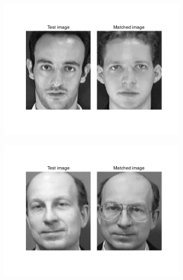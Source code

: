 \begin{homeworkProblem}
\begin{figure}[H]
\begin{subfigure}{0.5\textwidth}
      \includegraphics[width=1.\linewidth]{./images/match_3.png}
    \end{subfigure}%
    \begin{subfigure}{0.5\textwidth}
      \centering
      \includegraphics[width=1.\linewidth]{./images/match_4.png}
    \end{subfigure}
  \end{figure}
  \begin{figure}[H]
    \begin{subfigure}{0.5\textwidth}
      \centering

\end{subfigure}
\end{figure}
\end{homeworkProblem}
